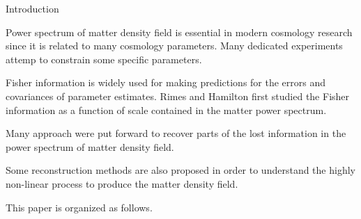 \begin{section}{Introduction}
  \label{sec:introduction}
  
  Power spectrum of matter density field is essential in modern cosmology research since it is related to many cosmology parameters. Many dedicated experiments attemp to constrain some specific parameters. 

  Fisher information is widely used for making predictions for the errors and covariances of parameter estimates. Rimes and Hamilton first studied the Fisher information as a function of scale contained in the matter power spectrum. 

  Many approach were put forward to recover parts of the lost information in the power spectrum of matter density field. 

  Some reconstruction methods are also proposed in order to understand the highly non-linear process to produce the matter density field.

  This paper is organized as follows.

\end{section}
